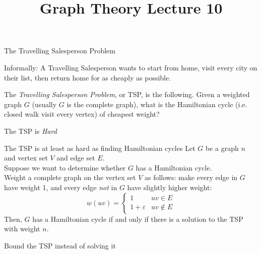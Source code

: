 \documentclass{beamer}
\title{Graph Theory Lecture 10}
\begin{document}
\begin{frame}{The Travelling Salesperson Problem}
\begin{block}{Informally:}
  A Travelling Salesperson wants to start from home, visit every city on their list, then return home for as cheaply as possible.
\end{block}

\begin{definition}
The \emph{Travelling Salesperson Problem}, or TSP, is the following.  Given a weighted graph $G$ (usually $G$ is the complete graph), what is the Hamiltonian cycle (i.e. closed walk visit every vertex) of cheapest weight?
  \end{definition}

\begin{block}{The TSP is \emph{Hard}}
  \end{block}

\end{frame}

\begin{frame}{The TSP is at least as hard as finding Hamiltonian cycles}
  Let $G$ be a graph $n$ and vertex set $V$ and edge set $E$. \\
  Suppose we want to determine whether $G$ has a Hamiltonian cycle.\\
Weight a complete graph on the vertex set $V$ as follows: make every edge in $G$ have weight 1, and every edge \emph{not} in $G$ have slightly higher weight:
  $$w(uv)=\begin{cases} 1 & uv \in E \\
1+\varepsilon & uv\notin E\end{cases} $$
Then, $G$ has a Hamiltonian cycle if and only if there is a solution to the TSP with weight $n$.

\begin{block}{Bound the TSP instead of solving it}
  \end{block}
\end{frame}
\end{document}
